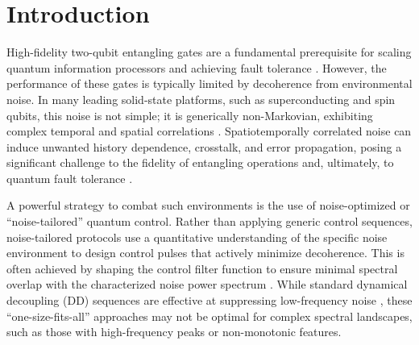 \documentclass[%
 reprint,
superscriptaddress,
 amsmath,amssymb,
 aps,
pra,
]{revtex4-2}
\newcommand{\qk}[1]{{\color{OliveGreen}#1}}
\begin{document}
\maketitle

\tableofcontents


\section{Introduction}

High-fidelity two-qubit entangling gates are a fundamental prerequisite for scaling quantum information processors and achieving fault tolerance \cite{NgPreskill, Acharya2025}. However, the performance of these gates is typically limited by decoherence from environmental noise. In many leading solid-state platforms, such as superconducting and spin qubits, this noise is not simple; it is generically non-Markovian, exhibiting complex temporal and spatial correlations \cite{Bylander2011Jul, PhysRevA.95.022121, Uwe2020}. Spatiotemporally correlated noise can induce unwanted history dependence, crosstalk, and error propagation, posing a significant challenge to the fidelity of entangling operations and, ultimately, to quantum fault tolerance \cite{Sarovar2020detectingcrosstalk, PhysRevA.104.L050404, PhysRevA.102.022221}.

A powerful strategy to combat such environments is the use of noise-optimized or ``noise-tailored'' quantum control. Rather than applying generic control sequences, noise-tailored protocols use a quantitative understanding of the specific noise environment to design control pulses that actively minimize decoherence. This is often achieved by shaping the control filter function to ensure minimal spectral overlap with the characterized noise power spectrum \cite{Faoro}. While standard dynamical decoupling (DD) sequences are effective at suppressing low-frequency noise \cite{Khodjasteh2013-ut, PazSilva2016}, these ``one-size-fits-all'' approaches may not be optimal for complex spectral landscapes, such as those with high-frequency peaks or non-monotonic features.
\end{document}
